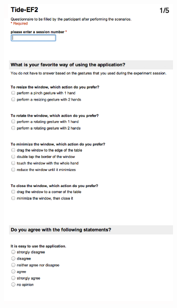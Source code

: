 \begin{figure}[htb]
  \centering
    \includegraphics[width=0.8\textwidth]{images/evalform2a}
\end{figure}

